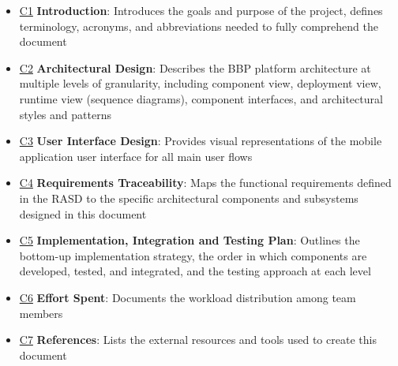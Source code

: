 \begin{itemize}
    \item \hyperref[ch:introduction]{\color{bluepoli}C1} \color{black} \textbf{Introduction}: Introduces the goals and purpose of the project, defines terminology, acronyms, and abbreviations needed to fully comprehend the document
    \item \hyperref[ch:architectural]{\color{bluepoli}C2} \color{black} \textbf{Architectural Design}: Describes the BBP platform architecture at multiple levels of granularity, including component view, deployment view, runtime view (sequence diagrams), component interfaces, and architectural styles and patterns
    \item \hyperref[ch:ui]{\color{bluepoli}C3} \color{black} \textbf{User Interface Design}: Provides visual representations of the mobile application user interface for all main user flows
    \item \hyperref[ch:traceability]{\color{bluepoli}C4} \color{black} \textbf{Requirements Traceability}: Maps the functional requirements defined in the RASD to the specific architectural components and subsystems designed in this document
    \item \hyperref[ch:implementation]{\color{bluepoli}C5} \color{black} \textbf{Implementation, Integration and Testing Plan}: Outlines the bottom-up implementation strategy, the order in which components are developed, tested, and integrated, and the testing approach at each level
    \item \hyperref[ch:effort]{\color{bluepoli}C6} \color{black} \textbf{Effort Spent}: Documents the workload distribution among team members
    \item \hyperref[ch:references]{\color{bluepoli}C7} \color{black} \textbf{References}: Lists the external resources and tools used to create this document
\end{itemize}